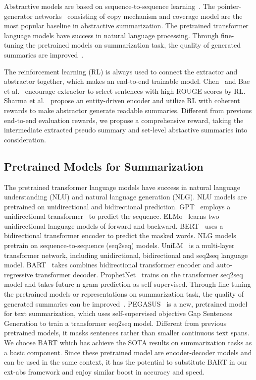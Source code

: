 Abstractive models are based on sequence-to-sequence learning~\cite{SutskeverVL14,BahdanauCB14}.
The pointer-generator networks~\cite{SeeLM17} consisting of
copy mechanism and coverage model are the most popular 
baseline in abstractive summarization. 
The pretrained transformer language models have success in 
natural language processing.
Through fine-tuning the pretrained models on summarization task,
the quality of generated summaries are improved~\cite{HiBert19,ZhongLWQH19}.

The reinforcement learning (RL) is always used to connect the extractor and abstractor together,
which makes an end-to-end trainable model.
Chen~ and Bae et al.~ encourage extractor
to select sentences with high ROUGE scores by RL. 
Sharma et al.~ propose an entity-driven encoder and
utilize RL with coherent rewards to make abstractor generate readable summaries. Different from previous end-to-end evaluation rewards, 
we propose a comprehensive reward, taking the intermediate extracted pseudo summary and set-level abstactive summaries into consideration.

\subsection{Pretrained Models for Summarization}
The pretrained transformer language models have success in natural language understanding (NLU)
and natural language generation (NLG).
NLU models are pretrained on unidirectional and bidirectional prediction.
GPT~\cite{GPT18} employs a unidirectional transformer~\cite{attn17} to predict the sequence. 
ELMo~\cite{ELMo18} learns two unidirectional language models of forward and backward.
BERT~\cite{Bert19} uses a bidirectional transformer encoder 
to predict the masked words.
NLG models pretrain on sequence-to-sequence (seq2seq) models. 
UniLM~\cite{UniLM19} is a multi-layer transformer network,
including unidirctional, bidirectional and seq2seq language model. 
BART~\cite{BART19} takes combines bidirectional transformer encoder 
and auto-regressive transformer decoder.
ProphetNet~\cite{ProNet20} trains on the transformer seq2seq model and 
takes future n-gram prediction as self-supervised.
Through fine-tuning the pretrained models or representations on summarization task,
the quality of generated summaries can be improved~\cite{HiBert19,ZhongLWQH19,MatchSum}.
PEGASUS~\cite{PEGASUS20} is a new, pretrained model for text summarization, 
which uses self-supervised objective Gap Sentences Generation to train 
a transformer seq2seq model. Different from previous pretrained models, 
it masks sentences rather than smaller continuous text spans.
We choose BART which has achieve the SOTA results on summarization tasks as a basic component.
Since these pretrained model are encoder-decoder models and can be used in the same context, %
it has the potential to substitute BART in our ext-abs framework
and enjoy similar boost in accuracy and speed.

